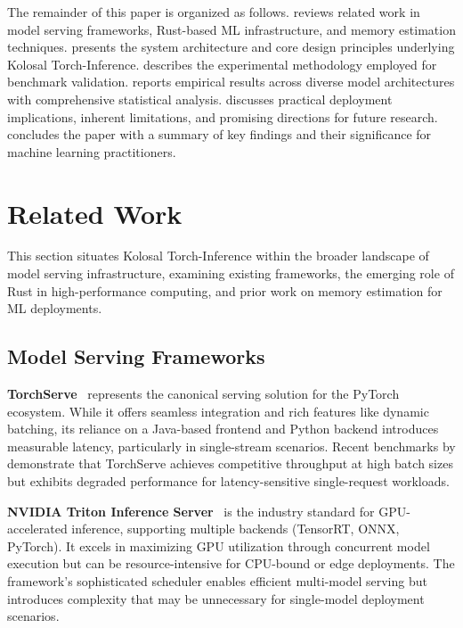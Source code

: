 \documentclass[10pt,twocolumn,a4paper]{article}
\theoremstyle{definition}
\theoremstyle{plain}
\begin{document}
The remainder of this paper is organized as follows.  reviews related work in model serving frameworks, Rust-based ML infrastructure, and memory estimation techniques.  presents the system architecture and core design principles underlying Kolosal Torch-Inference.  describes the experimental methodology employed for benchmark validation.  reports empirical results across diverse model architectures with comprehensive statistical analysis.  discusses practical deployment implications, inherent limitations, and promising directions for future research.  concludes the paper with a summary of key findings and their significance for machine learning practitioners.

\section{Related Work}
\label{sec:related}

This section situates Kolosal Torch-Inference within the broader landscape of model serving infrastructure, examining existing frameworks, the emerging role of Rust in high-performance computing, and prior work on memory estimation for ML deployments.

\subsection{Model Serving Frameworks}

\textbf{TorchServe}~\citep{torchserve} represents the canonical serving solution for the PyTorch ecosystem. While it offers seamless integration and rich features like dynamic batching, its reliance on a Java-based frontend and Python backend introduces measurable latency, particularly in single-stream scenarios. Recent benchmarks by \citet{mlperf2023} demonstrate that TorchServe achieves competitive throughput at high batch sizes but exhibits degraded performance for latency-sensitive single-request workloads.

\textbf{NVIDIA Triton Inference Server}~\citep{triton} is the industry standard for GPU-accelerated inference, supporting multiple backends (TensorRT, ONNX, PyTorch). It excels in maximizing GPU utilization through concurrent model execution but can be resource-intensive for CPU-bound or edge deployments. The framework's sophisticated scheduler enables efficient multi-model serving but introduces complexity that may be unnecessary for single-model deployment scenarios.
\end{document}
